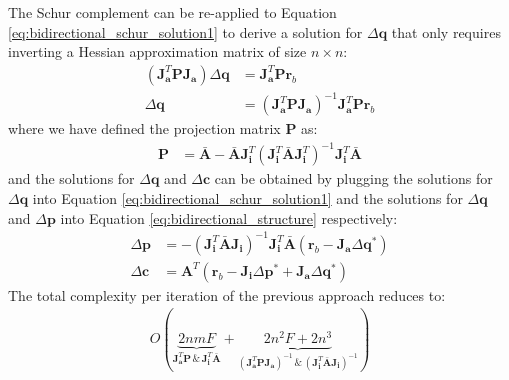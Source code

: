 The Schur complement can be re-applied to Equation \ref{eq:bidirectional_schur_solution1} to derive a solution for $\Delta\mathbf{q}$ that only requires inverting a Hessian approximation matrix of size $n \times n$:
\begin{equation}
    \begin{aligned}
        \left( \mathbf{J}_{\mathbf{a}}^T\mathbf{P}\mathbf{J}_{\mathbf{a}} \right) \Delta \mathbf{q} & = \mathbf{J}_{\mathbf{a}}^T\mathbf{P}\mathbf{r}_b
        \\
        \Delta \mathbf{q} & = \left( \mathbf{J}_{\mathbf{a}}^T\mathbf{P}\mathbf{J}_{\mathbf{a}} \right)^{-1} \mathbf{J}_{\mathbf{a}}^T\mathbf{P}\mathbf{r}_b
    \label{eq:bidirectional_schur_solution3}
    \end{aligned}
\end{equation}
where we have defined the projection matrix $\mathbf{P}$ as:
\begin{equation}
    \begin{aligned}
		\mathbf{P} &= \bar{\mathbf{A}} - \bar{\mathbf{A}}\mathbf{J}_{\mathbf{i}}^T \left( \mathbf{J}_{\mathbf{i}}^T\bar{\mathbf{A}}\mathbf{J}_{\mathbf{i}}^T \right)^{-1} \mathbf{J}_{\mathbf{i}}^T\bar{\mathbf{A}}
		\label{eq:bidirectional_schur_projection}
    \end{aligned}
\end{equation}
and the solutions for $\Delta\mathbf{q}$ and $\Delta\mathbf{c}$ can be obtained by plugging the solutions for $\Delta\mathbf{q}$ into Equation \ref{eq:bidirectional_schur_solution1} and the solutions for $\Delta\mathbf{q}$ and $\Delta\mathbf{p}$ into Equation \ref{eq:bidirectional_structure} respectively:
\begin{equation}
    \begin{aligned}
        \Delta \mathbf{p} & = -\left( \mathbf{J}_{\mathbf{i}}^T\bar{\mathbf{A}}\mathbf{J}_{\mathbf{i}} \right)^{-1} \mathbf{J}_{\mathbf{i}}^T\bar{\mathbf{A}} \left(\mathbf{r}_b - \mathbf{J}_{\mathbf{a}}\Delta \mathbf{q}^* \right)
        \\
        \Delta\mathbf{c} & = \mathbf{A}^T \left( \mathbf{r}_b - \mathbf{J}_{\mathbf{i}} \Delta\mathbf{p}^* + \mathbf{J}_{\mathbf{a}} \Delta\mathbf{q}^* \right)
    \label{eq:bidirectional_schur_solution4}
    \end{aligned}
\end{equation}
The total complexity per iteration of the previous approach reduces to:
\begin{equation}
    \begin{aligned}
        O(
        \underbrace{2nmF}_{
            \mathbf{J}_{\mathbf{a}}^T\mathbf{P}
            \, \& \,
            \mathbf{J}_{\mathbf{i}}^T\bar{\mathbf{A}}}
        +
        \underbrace{2n^2F + 2n^3}_{
            \left( \mathbf{J}_{\mathbf{a}}^T\mathbf{P}\mathbf{J}_{\mathbf{a}} \right)^{-1}
            \, \& \,
            \left( \mathbf{J}_{\mathbf{i}}^T \bar{\mathbf{A}} \mathbf{J}_{\mathbf{i}} \right)^{-1}}
        )
    \label{eq:complexity_schur_bidirectional2}
    \end{aligned}
\end{equation}
